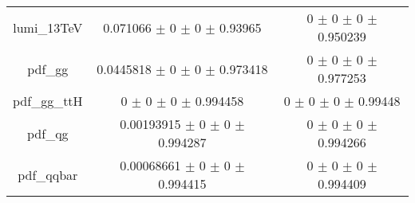 \begin{table}
\begin{tabular}{ccc}
lumi\_13TeV & \num{0.071066} $\pm$ \num{0} $\pm$ \num{0} $\pm$ \num{0.93965} & \num{0} $\pm$ \num{0} $\pm$ \num{0} $\pm$ \num{0.950239}\\
pdf\_gg & \num{0.0445818} $\pm$ \num{0} $\pm$ \num{0} $\pm$ \num{0.973418} & \num{0} $\pm$ \num{0} $\pm$ \num{0} $\pm$ \num{0.977253}\\
pdf\_gg\_ttH & \num{0} $\pm$ \num{0} $\pm$ \num{0} $\pm$ \num{0.994458} & \num{0} $\pm$ \num{0} $\pm$ \num{0} $\pm$ \num{0.99448}\\
pdf\_qg & \num{0.00193915} $\pm$ \num{0} $\pm$ \num{0} $\pm$ \num{0.994287} & \num{0} $\pm$ \num{0} $\pm$ \num{0} $\pm$ \num{0.994266}\\
pdf\_qqbar & \num{0.00068661} $\pm$ \num{0} $\pm$ \num{0} $\pm$ \num{0.994415} & \num{0} $\pm$ \num{0} $\pm$ \num{0} $\pm$ \num{0.994409}\\
\bottomrule
\end{tabular}
\end{table}